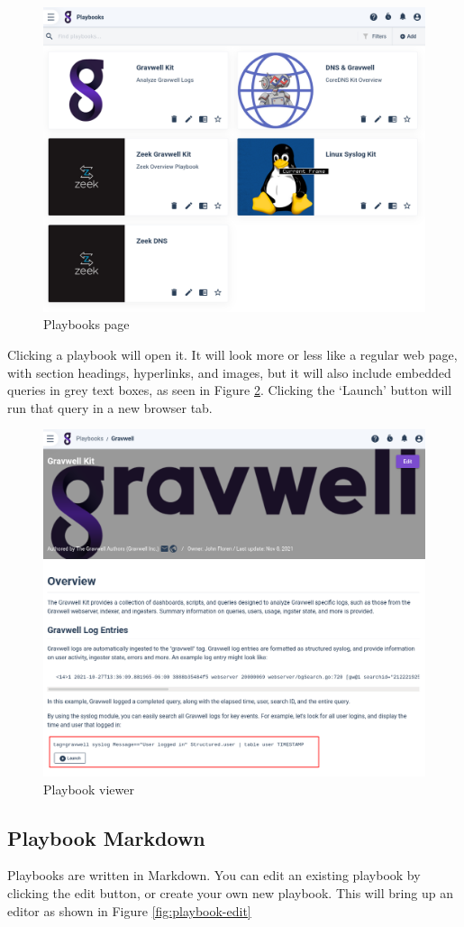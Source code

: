 \begin{figure}
	\includegraphics[width=0.8\linewidth]{images/playbooks.png}
	\caption{Playbooks page}
	\label{fig:playbooks}
\end{figure}

Clicking a playbook will open it. It will look more or less like a regular web page, with section headings, hyperlinks, and images, but it will also include embedded queries in grey text boxes, as seen in Figure \ref{fig:playbook-read}. Clicking the `Launch' button will run that query in a new browser tab.

\begin{figure}
	\includegraphics[width=0.8\linewidth]{images/playbook-read.png}
	\caption{Playbook viewer}
	\label{fig:playbook-read}
\end{figure}

\subsection{Playbook Markdown}
Playbooks are written in Markdown. You can edit an existing playbook by clicking the edit button, or create your own new playbook. This will bring up an editor as shown in Figure \ref{fig:playbook-edit}

